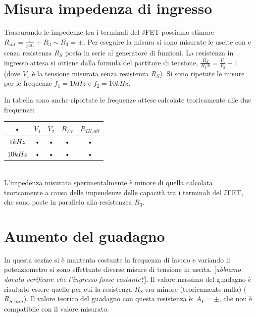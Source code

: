 \documentclass[10pt,a4paper]{article}
\newcommand{\rem}[1]{[\emph{#1}]}
\begin{document}
\section{Misura impedenza di ingresso}
Trascurando le impedenze tra i terminali del JFET possiamo stimare $R_{int} = \frac{1}{j \omega C} + R_3 \sim R_3 = \pm$. Per eseguire la misura si sono misurate le uscite con e senza resistenza $R_{S}$ posta in serie al generatore di funzioni. La resistenza in ingresso attesa si ottiene dalla formula del partitore di tensione, $\frac{R_S}{R_IN} = \frac {V_1}{V_2} - 1$ (dove $V_1$ è la tensione misurata senza resistenza $R_S$). Si sono ripetute le misure per le frequenze $f_1 = 1 kHz$ e $f_2 = 10 kHz$.

In tabella sono anche riportate le frequenze attese calcolate teoricamente alle due frequenze:\\

\begin{tabular}{|c|c|c|c|c|}
\hline 
• & $V_1$ & $V_2$ & $R_{IN}$ & $R_{IN, att}$ \\ 
\hline
$1 kHz$ & • & • & • & • \\ 
\hline 
$10 kHz$ & • & • & • & • \\ 
\hline 
\end{tabular}\\

L'impedenza misurata sperimentalmente è minore di quella calcolata teoricamente a causa delle impendenze delle capacità tra i terminali del JFET, che sono poste in parallelo alla resistenzea $R_3$.

\section{Aumento del guadagno}
In questa sezine si è mantenta costante la frequenza di lavoro e variando il potenziometro si sono effettuate diverse misure di tensione in uscita. \rem{abbiamo dovuto verificare che l'ingresso fosse costante?}. Il valore massimo del guadagno è risultato essere quello per cui la resistenza $R_S$ era minore (teoricamente nulla) ($R_{S, min}$). Il valore teorico del guadagno con questa resistenza è: $A_V = \pm $, che non è compatibile con il valore misurato.
\end{document}
